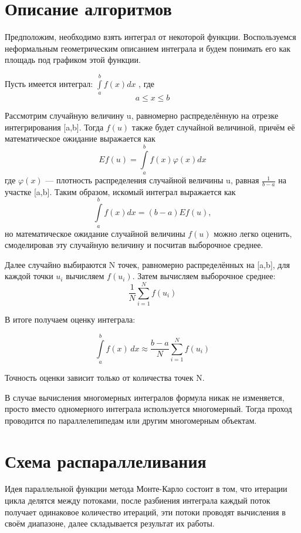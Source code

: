 \documentclass{report}
\begin{document}
\section*{Описание алгоритмов}
Предположим, необходимо взять интеграл от некоторой функции. Воспользуемся неформальным геометрическим описанием интеграла и будем понимать его как площадь под графиком этой функции.
\par Пусть имеется интеграл: $\int\limits_a^b f(x)dx$ , где $$ a\le x \le b $$

Рассмотрим случайную величину u, равномерно распределённую на отрезке интегрирования [a,b]. Тогда $f(u)$ также будет случайной величиной, причём её математическое ожидание выражается как
$$E f(u)=\int\limits_{a}^{b}f(x)\varphi(x)dx$$
где $\varphi(x)$ — плотность распределения случайной величины u, равная 
$\frac {1} {b-a}$ на участке [a,b]. Таким образом, искомый интеграл выражается как
$$\int\limits_a^b f(x)dx = (b-a) E f(u),$$
но математическое ожидание случайной величины $f(u)$ можно легко оценить, смоделировав эту случайную величину и посчитав выборочное среднее.

Далее случайно выбираются N точек, равномерно распределённых на [a,b], для каждой точки $u_i$ вычисляем $f(u_i)$. Затем вычисляем выборочное среднее: 
$$\frac{1}{N}\sum _{{i=1}}^{{N}}f(u_{i})$$

В итоге получаем оценку интеграла:

$$\int \limits _a^bf(x)\,dx\approx \frac {b-a}{N}\sum _{i=1}^{N}f(u_{i})$$

Точность оценки зависит только от количества точек N.
\par В случае вычисления многомерных интегралов формула никак не изменяется, просто вместо одномерного интеграла используется многомерный. Тогда проход проводится по параллелепипедам или другим многомерным объектам.
\newpage

\section*{Схема распараллеливания}
\par Идея параллельной функции метода Монте-Карло состоит в том, что итерации цикла делятся между потоками, после разбиения интеграла каждый поток получает одинаковое количество итераций, эти потоки проводят вычисления в своём диапазоне, далее складывается результат их работы.
\newpage
\end{document}
